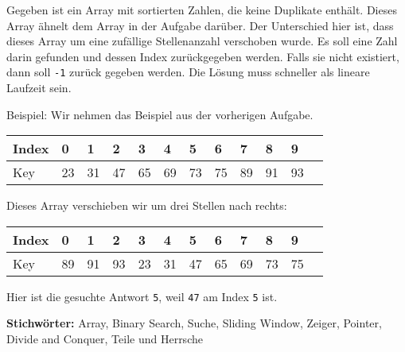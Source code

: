 \documentclass{book}
\begin{document}
\begin{examplei}
	Gegeben ist ein Array mit sortierten Zahlen, die keine Duplikate enthält. Dieses Array ähnelt dem Array in der Aufgabe darüber. Der Unterschied hier ist, dass dieses Array um eine zufällige Stellenanzahl verschoben wurde. Es soll eine Zahl darin gefunden und dessen Index zurückgegeben werden. Falls sie nicht existiert, dann soll \lstinline|-1| zurück gegeben werden. Die Lösung muss schneller als lineare Laufzeit sein.
	
	Beispiel:
	Wir nehmen das Beispiel aus der vorherigen Aufgabe.
	
	\begin{tabular}{|l|l|l|l|l|l|l|l|l|l|l|l|} 
		\hline
		Index & \cellcolor{yellow!25}0 & \cellcolor{yellow!25}1 & \cellcolor{yellow!25}2 & \cellcolor{yellow!25}3 & \cellcolor{yellow!25}4 & \cellcolor{yellow!25}5  & \cellcolor{yellow!25}6  & \cellcolor{yellow!25}7  & \cellcolor{yellow!25}8  & \cellcolor{yellow!25}9 \\ 
		\hline
		Key & \cellcolor{blue!25}23 & \cellcolor{blue!25}31 & \cellcolor{blue!25}47 & \cellcolor{blue!25}65 & \cellcolor{blue!25}69 & \cellcolor{blue!25}73 & \cellcolor{blue!25}75 & \cellcolor{blue!25}89 & \cellcolor{blue!25}91 & \cellcolor{blue!25}93 \\
		\hline
	\end{tabular}
	
	Dieses Array verschieben wir um drei Stellen nach rechts:
	
	\begin{tabular}{|l|l|l|l|l|l|l|l|l|l|l|l|} 
		\hline
		Index & \cellcolor{yellow!25}0 & \cellcolor{yellow!25}1 & \cellcolor{yellow!25}2 & \cellcolor{yellow!25}3 & \cellcolor{yellow!25}4 & \cellcolor{yellow!25}5  & \cellcolor{yellow!25}6  & \cellcolor{yellow!25}7  & \cellcolor{yellow!25}8  & \cellcolor{yellow!25}9 \\ 
		\hline
		Key & \cellcolor{green!25}89 & \cellcolor{green!25}91 & \cellcolor{green!25}93 & \cellcolor{blue!25}23 & \cellcolor{blue!25}31 & \cellcolor{blue!25}47 & \cellcolor{blue!25}65 & \cellcolor{blue!25}69 & \cellcolor{blue!25}73 & \cellcolor{blue!25}75 \\
		\hline
	\end{tabular}

Hier ist die gesuchte Antwort \lstinline|5|, weil \lstinline|47| am Index \lstinline|5| ist.	
\end{examplei}

{\bf Stichwörter:} Array, Binary Search, Suche, Sliding Window, Zeiger, Pointer, Divide and Conquer, Teile und Herrsche
\end{document}
